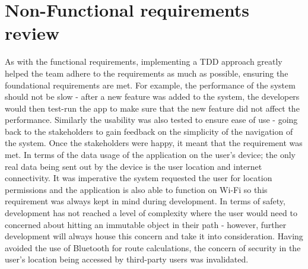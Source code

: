 \section{Non-Functional requirements review}
As with the functional requirements, implementing a TDD approach greatly helped the team adhere to the requirements as much as possible, ensuring the foundational requirements are met. For example, the performance of the system should not be slow - after a new feature was added to the system, the developers would then test-run the app to make sure that the new feature did not affect the performance. Similarly the usability was also tested to ensure ease of use - going back to the stakeholders to gain feedback on the simplicity of the navigation of the system. Once the stakeholders were happy, it meant that the requirement was met. In terms of the data usage of the application on the user's device; the only real data being sent out by the device is the user location and internet connectivity. It was imperative the system requested the user for location permissions and the application is also able to function on Wi-Fi so this requirement was always kept in mind during development. In terms of safety, development has not reached a level of complexity where the user would need to concerned about hitting an immutable object in their path - however, further development will always house this concern and take it into consideration. Having avoided the use of Bluetooth for route calculations, the concern of security in the user's location being accessed by third-party users was invalidated. 